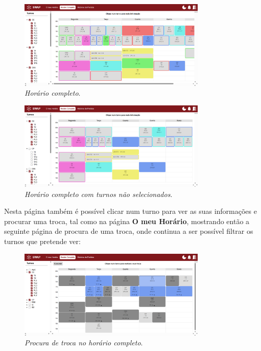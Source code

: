 \documentclass[12pt, a4paper]{article}
\begin{document}
\begin{figure}[H]
    \centering
    \includegraphics[width=0.8\textwidth]{res/manual/horario_completo.png}
    \caption{\emph{Horário completo}.}
    \label{horario_completo}
\end{figure}

\begin{figure}[H]
    \centering
    \includegraphics[width=0.8\textwidth]{res/manual/horario_completo_filtrado.png}
    \caption{\emph{Horário completo com turnos não selecionados}.}
    \label{horario_completo_filtrado}
\end{figure}

Nesta página também é possível clicar num turno para ver as suas informações e procurar uma troca,
tal como na página \textbf{O meu Horário}, mostrando então a seguinte página de
procura de uma troca, onde continua a ser possível filtrar os turnos que pretende ver:

\begin{figure}[H]
    \centering
    \includegraphics[width=0.8\textwidth]{res/manual/procura_troca_horario_completo.png}
    \caption{\emph{Procura de troca no horário completo}.}
    \label{procura_troca_horario_completo}
\end{figure}
\end{document}
